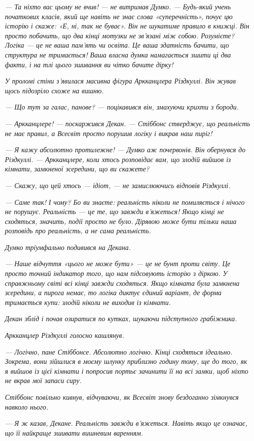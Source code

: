 \documentclass[12pt, a4paper, openany]{book}
\begin{document}
\begin{terrybox}
\textit{--- Та ніхто вас цьому не вчив! --- не витримав Думко. --- Будь-який учень початкових класів, який ще навіть не знає слова «суперечність», почує цю історію і скаже: «Е, ні, так не буває». Він не шукатиме правило в книжці. Він просто побачить, що два кінці мотузки не зв'язані між собою. Розумієте? Логіка --- це не ваша пам'ять чи освіта. Це ваша здатність бачити, що структура не тримається! Ваша власна думка намагається зшити ці два факти, і на тлі цього зшивання ви чітко бачите дірку!}

\textit{У проломі стіни з'явилася масивна фігура Аркканцлера Різдкуллі. Він жував щось підозріло схоже на вишню.}

\textit{--- Що тут за галас, панове? --- поцікавився він, змахуючи крихти з бороди.}

\textit{--- Аркканцлере! --- поскаржився Декан. --- Стіббонс стверджує, що реальність не має правил, а Всесвіт просто порушив логіку і викрав наш пиріг!}

\textit{--- Я кажу абсолютно протилежне! --- Думко аж почервонів. Він обернувся до Різдкуллі. --- Аркканцлере, коли хтось розповідає вам, що злодій вийшов із кімнати, замкненої зсередини, що ви скажете?}

\textit{--- Скажу, що цей хтось --- ідіот, --- не замислюючись відповів Різдкуллі.}

\textit{--- Саме так! І чому? Бо ви знаєте: реальність ніколи не помиляється і нічого не порушує. Реальність --- це те, що завжди в'яжеться! Якщо кінці не сходяться, значить, події просто не було. Дірявою може бути тільки наша розповідь про реальність, а не сама реальність.}

\textit{Думко тріумфально подивився на Декана.}

\textit{--- Наше відчуття «цього не може бути» --- це не бунт проти світу. Це просто точний індикатор того, що нам підсовують історію з діркою. У справжньому світі всі кінці завжди сходяться. Якщо кімната була замкнена зсередини, а пирога немає, то логіка диктує єдиний варіант, де форма тримається купи: злодій ніколи не виходив із кімнати.}

\textit{Декан зблід і почав озиратися по кутках, шукаючи підступного грабіжника.}

\textit{Аркканцлер Різдкуллі голосно кашлянув.}

\textit{--- Логічно, пане Стіббонсе. Абсолютно логічно. Кінці сходяться ідеально. Зокрема, вони зійшлися в моєму шлунку приблизно годину тому, ще до того, як я вийшов із цієї кімнати і попросив портьє зачинити її на всі замки, щоб ніхто не вкрав мої запаси сиру.}

\textit{Стіббонс повільно кивнув, відчуваючи, як Всесвіт знову бездоганно зімкнувся навколо нього.}

\textit{--- Я ж казав, Декане. Реальність завжди в'яжеться. Навіть якщо це означає, що її найкраще зшивати вишневим варенням.}
\end{terrybox}
\end{document}

